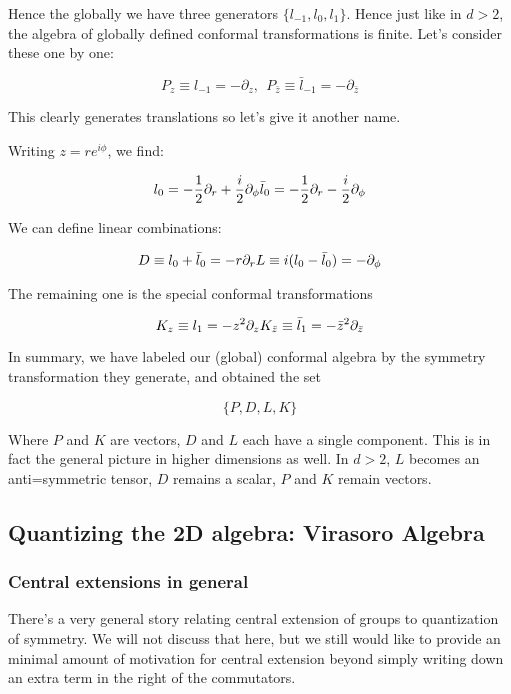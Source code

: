 Hence the globally we have three generators $\{l_{-1}, l_0, l_1\}$.  Hence just like in $d>2$, the algebra of globally defined conformal transformations is finite. Let's consider these one by one:

$$
    P_z \equiv  l_{-1} = - \partial_z, ~~
    P_{\bar z} \equiv  \bar l_{-1} = - \partial_{\bar z}
$$

This clearly generates translations so let's give it another name.

Writing $z = re^{i \phi}$, we find:

$$
    l_{0} = -  \frac12 \partial_r + \frac i2 \partial_\phi \\
    \bar l_{0} = -  \frac12 \partial_r - \frac i2 \partial_\phi
$$


We can define linear combinations:

$$ D \equiv l_0 + \bar l_0 = -r \partial_r \\
L \equiv i(l_0 - \bar l_0) = -\partial_\phi$$

The remaining one is the special conformal transformations

$$ K_z \equiv l_1 = - z^2 \partial_z \\
 K_{\bar z} \equiv  \bar  l_1 = - \bar z^2 \partial_ {\bar z}$$

In summary, we have labeled our (global) conformal algebra by the symmetry transformation they generate, and obtained the set

$$\{ P, D, L, K \}$$ 

Where $P$ and $K$ are vectors, $D$ and $L$ each have a single component. 
This is in fact the general picture in higher dimensions as well. In $d>2$,  $L$ becomes an anti=symmetric tensor, $D$ remains a scalar, $P$ and $K$ remain vectors.


\subsection{ Quantizing the 2D algebra: Virasoro Algebra}

\subsubsection{ Central extensions in general}

There's a very general story relating central extension of groups to quantization of symmetry. We will not discuss that here, but we still would like to provide an minimal amount of motivation for central extension beyond simply writing down an extra term in the right of the commutators.

